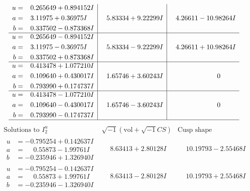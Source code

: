 \documentclass[1p]{elsarticle_modified}
\theoremstyle{definition}
\newcommand{\I}{\sqrt{-1}}
\begin{document}
$$\begin{array}{c|c|c}
\begin{aligned}
u &= \phantom{-}0.265649 + 0.894152 I \\
a &= \phantom{-}3.11975 + 0.36975 I \\
b &= \phantom{-}0.337502 - 0.873368 I\end{aligned}
 & \phantom{-}5.83334 + 9.22299 I & \phantom{-}4.26611 - 10.98264 I \\ \hline\begin{aligned}
u &= \phantom{-}0.265649 - 0.894152 I \\
a &= \phantom{-}3.11975 - 0.36975 I \\
b &= \phantom{-}0.337502 + 0.873368 I\end{aligned}
 & \phantom{-}5.83334 - 9.22299 I & \phantom{-}4.26611 + 10.98264 I \\ \hline\begin{aligned}
u &= \phantom{-}0.413478 + 1.077210 I \\
a &= \phantom{-}0.109640 + 0.430017 I \\
b &= \phantom{-}0.793990 + 0.174737 I\end{aligned}
 & \phantom{-}1.65746 + 3.60243 I & \phantom{-0.000000 } 0 \\ \hline\begin{aligned}
u &= \phantom{-}0.413478 - 1.077210 I \\
a &= \phantom{-}0.109640 - 0.430017 I \\
b &= \phantom{-}0.793990 - 0.174737 I\end{aligned}
 & \phantom{-}1.65746 - 3.60243 I & \phantom{-0.000000 } 0\\
 \hline 
 \end{array}$$\newpage$$\begin{array}{c|c|c}  
\text{Solutions to }I^u_{2}& \I (\text{vol} + \sqrt{-1}CS) & \text{Cusp shape}\\
 \hline 
\begin{aligned}
u &= -0.795254 + 0.142637 I \\
a &= \phantom{-}0.55873 - 1.99761 I \\
b &= -0.235946 + 1.326940 I\end{aligned}
 & \phantom{-}8.63413 + 2.80128 I & \phantom{-}10.19793 - 2.55468 I \\ \hline\begin{aligned}
u &= -0.795254 - 0.142637 I \\
a &= \phantom{-}0.55873 + 1.99761 I \\
b &= -0.235946 - 1.326940 I\end{aligned}
 & \phantom{-}8.63413 - 2.80128 I & \phantom{-}10.19793 + 2.55468 I \\ \hline\begin{aligned}

\end{aligned}
\end{array}$$
\end{document}
